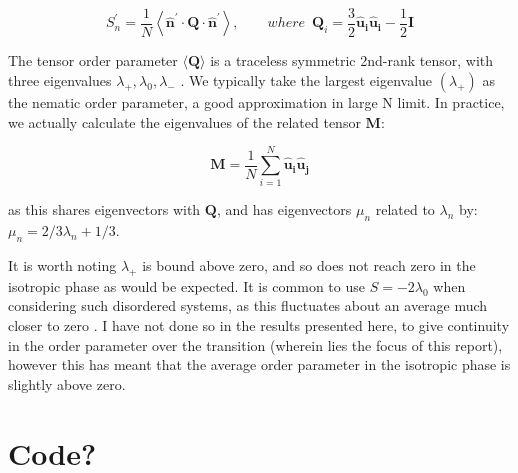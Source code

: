 \documentclass[11pt, a4paper]{article} %
\begin{document}
\begin{appendices}
\begin{equation}
S^{\prime}_{n} = \frac{1}{N} \left\langle \boldsymbol{\hat{n}^{\prime}} \cdot \textbf{Q} \cdot \boldsymbol{\hat{n}^{\prime}}  \right\rangle, \qquad where \enspace \textbf{Q}_{i} = \frac{3}{2} \boldsymbol{\hat{u}_{i}}\boldsymbol{\hat{u}_{i}}-\frac{1}{2}\textbf{I}
\end{equation}

The tensor order parameter $\langle \textbf{Q} \rangle$ is a traceless symmetric 2nd-rank tensor, with three eigenvalues $\lambda_{+}, \lambda_{0}, \lambda_{-}$ \cite{Eppenga1984}. We typically take the largest eigenvalue $(\lambda_{+})$ as the nematic order parameter, a good approximation in large N limit.
In practice, we actually calculate the eigenvalues of the related tensor $\textbf{M}$:

\begin{equation}
\textbf{M} =  \frac{1}{N} \sum_{i=1}^{N} \boldsymbol{\hat{u}_{i}}\boldsymbol{\hat{u}_{j}}
\end{equation}

as this shares eigenvectors with $\textbf{Q}$, and has eigenvectors $\mu_{n}$ related to $\lambda_{n}$ by: $\mu_{n} = 2/3 \lambda_{n} + 1/3$.

It is worth noting $\lambda_{+}$ is bound above zero, and so does not reach zero in the isotropic phase as would be expected. It is common to use $S =  -2\lambda_{0}$ when considering such disordered systems, as this fluctuates about an average much closer to zero \cite{Mountain1977}. I have not done so in the results presented here, to give continuity in the order parameter over the transition (wherein lies the focus of this report), however this has meant that the average order parameter in the isotropic phase is slightly above zero.


\section{Code?}

\end{appendices}
\end{document}
